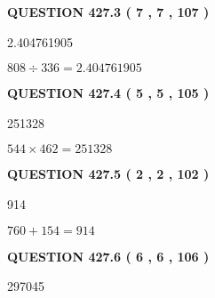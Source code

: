 \documentclass{ctexart}
\begin{document}
{\textbf{\Large{QUESTION
427.3 
 ( 7 , 7 , 107 )
}}}
  
  
 
 
\noindent{}

2.404761905
 
 
 
 
\noindent{}

$ %
808 \div  %
336=   %
2.404761905$
 
 
  
\vspace{0.2in}
  
{\textbf{\Large{QUESTION
427.4 
 ( 5 , 5 , 105 )
}}}
  
  
 
 
\noindent{}

251328
 
 
 
 
\noindent{}

$ %
544 \times  %
462=   %
251328$
 
 
  
\vspace{0.2in}
  
{\textbf{\Large{QUESTION
427.5 
 ( 2 , 2 , 102 )
}}}
  
  
 
 
\noindent{}

914
 
 
 
 
\noindent{}

$ %
760 +  %
154=   %
914$
 
 
  
\vspace{0.2in}
  
{\textbf{\Large{QUESTION
427.6 
 ( 6 , 6 , 106 )
}}}
  
  
 
 
\noindent{}

297045
 
 
 
 
\noindent{}
\end{document}
